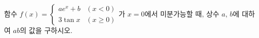 함수 $f(x)=\begin{cases} ae^x+b & (x<0) \\ 3\tan x & (x\ge 0) \end{cases}$가 $x=0$에서 미분가능할 때, 상수 $a$, $b$에 대하여 $ab$의 값을 구하시오.
